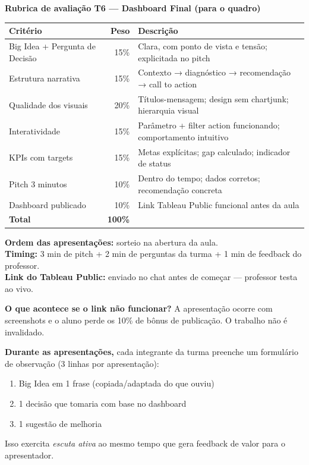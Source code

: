 \begin{BoardBox}
\textbf{Rubrica de avaliação T6 — Dashboard Final (para o quadro)}

\begin{tabular}{|p{4cm}|r|p{8cm}|}
\hline
\textbf{Critério} & \textbf{Peso} & \textbf{Descrição} \\
\hline
Big Idea + Pergunta de Decisão & 15\% & Clara, com ponto de vista e tensão; explicitada no pitch \\
Estrutura narrativa & 15\% & Contexto → diagnóstico → recomendação → call to action \\
Qualidade dos visuais & 20\% & Títulos-mensagem; design sem chartjunk; hierarquia visual \\
Interatividade & 15\% & Parâmetro + filter action funcionando; comportamento intuitivo \\
KPIs com targets & 15\% & Metas explícitas; gap calculado; indicador de status \\
Pitch 3 minutos & 10\% & Dentro do tempo; dados corretos; recomendação concreta \\
Dashboard publicado & 10\% & Link Tableau Public funcional antes da aula \\
\hline
\textbf{Total} & \textbf{100\%} & \\
\hline
\end{tabular}
\end{BoardBox}

\begin{SolvedBox}
\textbf{Ordem das apresentações:} sorteio na abertura da aula.\\
\textbf{Timing:} 3 min de pitch + 2 min de perguntas da turma + 1 min de feedback do professor.\\
\textbf{Link do Tableau Public:} enviado no chat antes de começar — professor testa ao vivo.

\textbf{O que acontece se o link não funcionar?} A apresentação ocorre com screenshots
e o aluno perde os 10\% de bônus de publicação. O trabalho não é invalidado.

\textbf{Durante as apresentações,} cada integrante da turma preenche um
formulário de observação (3 linhas por apresentação):
\begin{enumerate}
  \item Big Idea em 1 frase (copiada/adaptada do que ouviu)
  \item 1 decisão que tomaria com base no dashboard
  \item 1 sugestão de melhoria
\end{enumerate}

Isso exercita \emph{escuta ativa} ao mesmo tempo que gera feedback de valor para o apresentador.
\end{SolvedBox}

